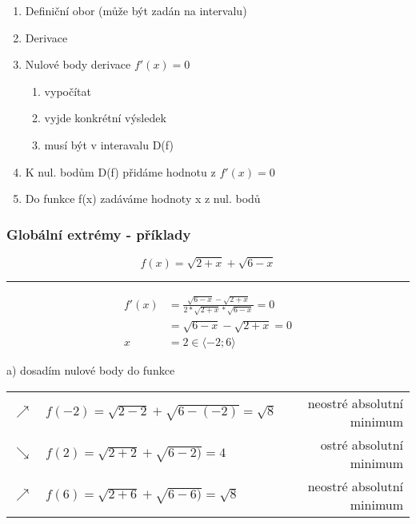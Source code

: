 \begin{enumerate}
  \item Definiční obor (může být zadán na intervalu)
  \item Derivace
  \item Nulové body derivace $f'(x)=0$
    \begin{enumerate}[label=(\alph*)]
      \item vypočítat
      \item vyjde konkrétní výsledek
      \item musí být v interavalu D(f)
    \end{enumerate}
  \item K nul. bodům D(f) přidáme hodnotu z $f'(x)=0$
  \item Do funkce f(x) zadáváme hodnoty x z nul. bodů
\end{enumerate}
\subsubsection{Globální extrémy - příklady}
\begin{equation}
  f(x)=\sqrt{2+x}+\sqrt{6-x}
\end{equation}
\hrule
\begin{align*}
  f'(x)&=\frac{\sqrt{6-x}-\sqrt{2+x}}{2*\sqrt{2+x}*\sqrt{6-x}}=0\\
  &=\sqrt{6-x}-\sqrt{2+x}=0\\
  x&=2\in\langle-2;6\rangle
\end{align*}
\begin{center}
\end{center}

a) dosadím nulové body do funkce
\begin{center}
\end{center}

\begin{tabular}{ c l r } 
$\nearrow$ & $f(-2)=\sqrt{2-2}+\sqrt{6-(-2)}=\sqrt{8}$ & neostré absolutní minimum \\
$\searrow$ & $f(2)=\sqrt{2+2}+\sqrt{6-2)}=4$ & ostré absolutní minimum \\
$\nearrow$ & $f(6)=\sqrt{2+6}+\sqrt{6-6)}=\sqrt{8}$ & neostré absolutní minimum \\
\end{tabular}

